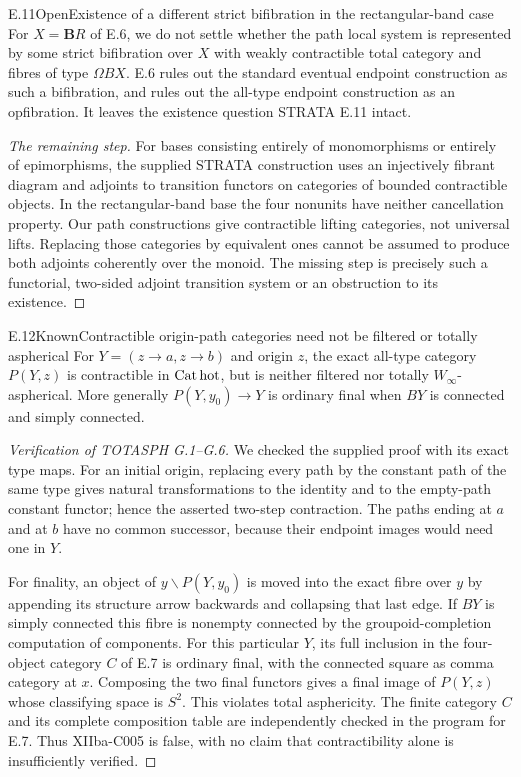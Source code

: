 \begin{result}{E.11}{Open}{Existence of a different strict bifibration in the rectangular-band case}
For $X=\mathbf B R$ of E.6, we do not settle whether the path local system is represented by some strict bifibration over $X$ with weakly contractible total category and fibres of type $\Omega BX$. E.6 rules out the standard eventual endpoint construction as such a bifibration, and rules out the all-type endpoint construction as an opfibration. It leaves the existence question STRATA E.11 intact.
\end{result}
\begin{proof}[The remaining step]
For bases consisting entirely of monomorphisms or entirely of epimorphisms, the supplied STRATA construction uses an injectively fibrant diagram and adjoints to transition functors on categories of bounded contractible objects. In the rectangular-band base the four nonunits have neither cancellation property. Our path constructions give contractible lifting categories, not universal lifts. Replacing those categories by equivalent ones cannot be assumed to produce both adjoints coherently over the monoid. The missing step is precisely such a functorial, two-sided adjoint transition system or an obstruction to its existence.
\end{proof}

\begin{result}{E.12}{Known}{Contractible origin-path categories need not be filtered or totally aspherical}
For $Y=(z\to a,z\to b)$ and origin $z$, the exact all-type category $P(Y,z)$ is contractible in $\mathrm{Cat}\,\mathrm{hot}$, but is neither filtered nor totally $W_\infty$-aspherical. More generally $P(Y,y_0)\to Y$ is ordinary final when $BY$ is connected and simply connected.
\end{result}
\begin{proof}[Verification of TOTASPH G.1--G.6]
We checked the supplied proof with its exact type maps. For an initial origin, replacing every path by the constant path of the same type gives natural transformations to the identity and to the empty-path constant functor; hence the asserted two-step contraction. The paths ending at $a$ and at $b$ have no common successor, because their endpoint images would need one in $Y$.

For finality, an object of $y\backslash P(Y,y_0)$ is moved into the exact fibre over $y$ by appending its structure arrow backwards and collapsing that last edge. If $BY$ is simply connected this fibre is nonempty connected by the groupoid-completion computation of components. For this particular $Y$, its full inclusion in the four-object category $C$ of E.7 is ordinary final, with the connected square as comma category at $x$. Composing the two final functors gives a final image of $P(Y,z)$ whose classifying space is $S^2$. This violates total asphericity. The finite category $C$ and its complete composition table are independently checked in the program for E.7. Thus XIIba-C005 is false, with no claim that contractibility alone is insufficiently verified.
\end{proof}

